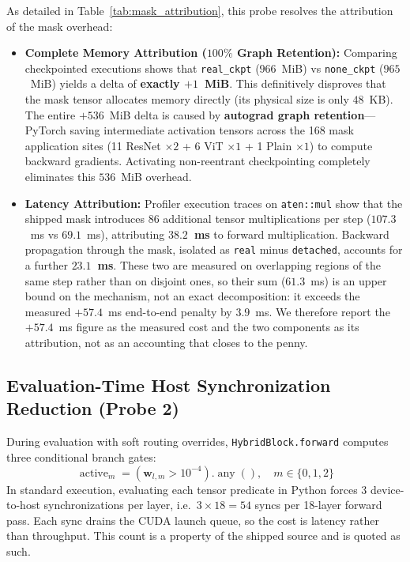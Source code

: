 \documentclass[11pt, a4paper]{article}
\begin{document}
As detailed in Table~\ref{tab:mask_attribution}, this probe resolves the attribution of the mask overhead:
\begin{itemize}
    \item \textbf{Complete Memory Attribution ($100\%$ Graph Retention):} Comparing checkpointed executions shows that \texttt{real\_ckpt} ($966$~MiB) vs \texttt{none\_ckpt} ($965$~MiB) yields a delta of \textbf{exactly $+1$~MiB}. This definitively disproves that the mask tensor allocates memory directly (its physical size is only $48$~KB). The entire $+536$~MiB delta is caused by \textbf{autograd graph retention}---PyTorch saving intermediate activation tensors across the 168 mask application sites (11 ResNet $\times 2$ + 6 ViT $\times 1$ + 1 Plain $\times 1$) to compute backward gradients. Activating non-reentrant checkpointing completely eliminates this $536$~MiB overhead.
    \item \textbf{Latency Attribution:} Profiler execution traces on \texttt{aten::mul} show that the shipped mask introduces 86 additional tensor multiplications per step ($107.3$~ms vs $69.1$~ms), attributing \textbf{$38.2$~ms} to forward multiplication. Backward propagation through the mask, isolated as \texttt{real} minus \texttt{detached}, accounts for a further \textbf{$23.1$~ms}. These two are measured on overlapping regions of the same step rather than on disjoint ones, so their sum ($61.3$~ms) is an upper bound on the mechanism, not an exact decomposition: it exceeds the measured $+57.4$~ms end-to-end penalty by $3.9$~ms. We therefore report the $+57.4$~ms figure as the measured cost and the two components as its attribution, not as an accounting that closes to the penny.
\end{itemize}

\subsection{Evaluation-Time Host Synchronization Reduction (Probe 2)}
\label{sec:sync_reduction}

During evaluation with soft routing overrides, \texttt{HybridBlock.forward} computes three conditional branch gates:
\begin{equation}
    \operatorname{active}_m = (\mathbf{w}_{l, m} > 10^{-4}).\operatorname{any}(), \quad m \in \{0, 1, 2\}
\end{equation}
In standard execution, evaluating each tensor predicate in Python forces 3 device-to-host synchronizations per layer, i.e.\ $3 \times 18 = 54$ syncs per 18-layer forward pass. Each sync drains the CUDA launch queue, so the cost is latency rather than throughput. This count is a property of the shipped source and is quoted as such.
\end{document}

